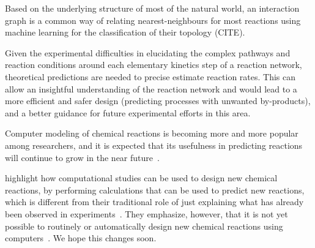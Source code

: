 Based on the underlying structure of most of the natural world,
an interaction graph is a common way of relating
nearest-neighbours for most reactions using machine learning
for the classification of their topology (CITE).

Given the experimental difficulties in elucidating the complex pathways and reaction conditions around each elementary kinetics step of a reaction network,
theoretical predictions are needed to precise estimate reaction rates.
This can allow an insightful understanding of the reaction network and would lead to a more efficient and safer design (predicting processes with unwanted by-products),
and a better guidance for future experimental efforts in this area.

Computer modeling of chemical reactions is becoming more and more popular among researchers,
and it is expected that its usefulness in predicting reactions will continue to grow in the near future~\cite{Ahn_2019}.

\citeauthor{Ahn_2019} highlight how computational studies can be used to design new chemical reactions,
by performing calculations that can be used to predict new reactions,
which is different from their traditional role of just explaining what has already been observed in experiments~\cite{Ahn_2019}.
They emphasize, however,
that it is not yet possible to routinely or automatically design new chemical reactions using computers~\cite{Ahn_2019}.
We hope this changes soon.
